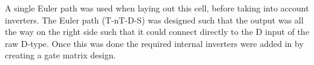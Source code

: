 
A single Euler path was used when laying out this cell, before taking into
account inverters. The Euler path (T-nT-D-S) was designed such that the output was all the
way on the right side such that it could connect directly to the D input of the
raw D-type. Once this was done the required internal inverters were added in by
creating a gate matrix design. 


